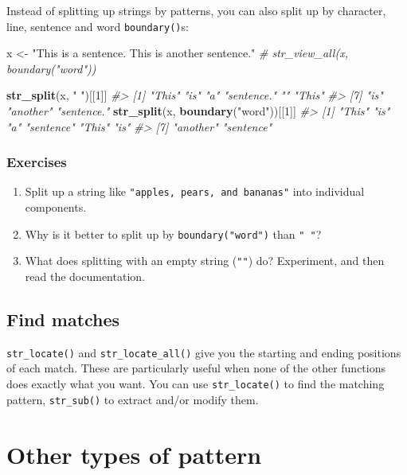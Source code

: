 \documentclass[]{book}
\newenvironment{Shaded}{\begin{snugshade}}{\end{snugshade}}
\newcommand{\KeywordTok}[1]{\textcolor[rgb]{0.13,0.29,0.53}{\textbf{{#1}}}}
\newcommand{\DecValTok}[1]{\textcolor[rgb]{0.00,0.00,0.81}{{#1}}}
\newcommand{\StringTok}[1]{\textcolor[rgb]{0.31,0.60,0.02}{{#1}}}
\newcommand{\CommentTok}[1]{\textcolor[rgb]{0.56,0.35,0.01}{\textit{{#1}}}}
\newcommand{\NormalTok}[1]{{#1}}
\begin{document}
Instead of splitting up strings by patterns, you can also split up by
character, line, sentence and word \texttt{boundary()}s:

\begin{Shaded}
\begin{Highlighting}[]
\NormalTok{x <-}\StringTok{ "This is a sentence.  This is another sentence."}
\CommentTok{# str_view_all(x, boundary("word"))}

\KeywordTok{str_split}\NormalTok{(x, }\StringTok{" "}\NormalTok{)[[}\DecValTok{1}\NormalTok{]]}
\CommentTok{#> [1] "This"      "is"        "a"         "sentence." ""          "This"     }
\CommentTok{#> [7] "is"        "another"   "sentence."}
\KeywordTok{str_split}\NormalTok{(x, }\KeywordTok{boundary}\NormalTok{(}\StringTok{"word"}\NormalTok{))[[}\DecValTok{1}\NormalTok{]]}
\CommentTok{#> [1] "This"     "is"       "a"        "sentence" "This"     "is"      }
\CommentTok{#> [7] "another"  "sentence"}
\end{Highlighting}
\end{Shaded}

\subsubsection{Exercises}\label{exercises-40}

\begin{enumerate}
\def\labelenumi{\arabic{enumi}.}
\item
  Split up a string like \texttt{"apples,\ pears,\ and\ bananas"} into
  individual components.
\item
  Why is it better to split up by \texttt{boundary("word")} than
  \texttt{"\ "}?
\item
  What does splitting with an empty string (\texttt{""}) do? Experiment,
  and then read the documentation.
\end{enumerate}

\subsection{Find matches}\label{find-matches}

\texttt{str\_locate()} and \texttt{str\_locate\_all()} give you the
starting and ending positions of each match. These are particularly
useful when none of the other functions does exactly what you want. You
can use \texttt{str\_locate()} to find the matching pattern,
\texttt{str\_sub()} to extract and/or modify them.

\section{Other types of pattern}\label{other-types-of-pattern}
\end{document}
